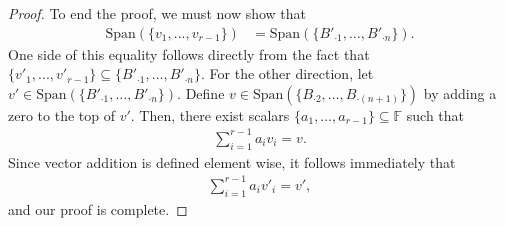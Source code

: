 \documentclass[10pt,a4paper]{article}
\theoremstyle{definition}
\begin{document}
\begin{proof}
To end the proof, we must now show that 
\begin{align*}
\text{Span}\left( \{v_1, ..., v_{r - 1} \} \right) &= \text{Span}\left( \{B'_{\cdot 1}, \dots, B'_{\cdot n} \} \right).
\end{align*}
One side of this equality follows directly from the fact that $\{v'_1, ..., v'_{r - 1} \} \subseteq \{ B'_{\cdot 1}, \dots, B'_{\cdot n} \}$. For the other direction, let $v' \in  \text{Span}\left( \{B'_{\cdot 1}, \dots, B'_{\cdot n} \} \right)$. Define $v \in \text{Span}\left( \{B_{\cdot 2}, \dots, B_{\cdot (n + 1)} \} \right)$ by adding a zero to the top of $v'$. Then, there exist scalars $\{a_1, \dots, a_{r-1} \} \subseteq \mathbb{F}$ such that 
\begin{align*}
\sum_{i = 1}^{r-1} a_i v_i = v.
\end{align*}
Since vector addition is defined element wise, it follows immediately that 
\begin{align*}
\sum_{i = 1}^{r-1} a_i v'_i = v',
\end{align*}
and our proof is complete.
\end{proof}
\end{document}
